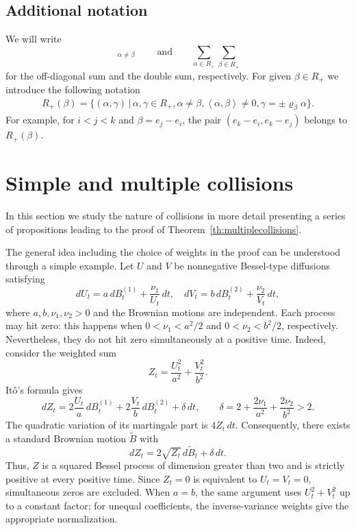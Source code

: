 \documentclass{article}
\numberwithin{equation}{section}
\newcommand{\cond}[1]{\, #1 \vert \,}
\newcommand{\aR}{\alpha\in R_+}
\newcommand{\bR}{\beta\in R_+}
\newcommand{\SabR}{\sum_{\alpha\in R_+}\sum_{\beta\in R_+}}
\newcommand{\SanbR}{\mathop{\sum_{\aR}\sum_{\bR}}_{\alpha\neq \beta}}
\newcommand{\ab}{\left<\alpha,\beta\right>}
\newcommand{\reflect}[1]{\varrho_{#1}}
\theoremstyle{plain}
\begin{document}
\subsection{Additional notation}
We will write  
    \begin{equation*}
        \SanbR\qquad \textrm{and} \qquad \SabR
    \end{equation*}
for the off-diagonal sum and the double sum, respectively. For given $\beta\in R_+$ we introduce the following notation 
\begin{align}
    \label{eq:Rplus}
    R_+(\beta) = \big\{(\alpha,\gamma)\cond{} \alpha,\gamma\in R_+, \alpha\neq \beta, \ab\neq 0,\gamma = \pm\reflect{\beta}\alpha\big\}.
\end{align}
For example, for $i<j<k$ and $\beta=e_j-e_i$,
the pair $(e_k-e_i,e_k-e_j)$ belongs to $R_+(\beta)$.

\section{Simple and multiple collisions}
\label{sec:collisions}
In this section we study the nature of collisions in more detail presenting a series of propositions leading to the proof of Theorem~\ref{th:multiplecollisions}. 

The general idea including the choice of weights in the proof can be understood through a simple example. Let $U$ and $V$ be nonnegative Bessel-type diffusions satisfying
\begin{equation*}
    dU_t=a\,dB_t^{(1)}+\frac{\nu_1}{U_t}\,dt,\quad 
    dV_t=b\,dB_t^{(2)}+\frac{\nu_2}{V_t}\,dt,
\end{equation*}
where $a,b,\nu_1,\nu_2>0$ and the Brownian motions are independent. Each process may hit zero: this happens when $0<\nu_1<a^2/2$ and $0<\nu_2<b^2/2$, respectively. Nevertheless, they do not hit zero simultaneously at a positive time.
Indeed, consider the weighted sum
    \begin{equation*}
        Z_t=\frac{U_t^2}{a^2}+\frac{V_t^2}{b^2}.
    \end{equation*}
It\^o's formula gives
    \begin{equation*}
        dZ_t = 2\frac{U_t}{a}\,dB_t^{(1)} +2\frac{V_t}{b}\,dB_t^{(2)} +\delta\,dt, \qquad \delta=2+\frac{2\nu_1}{a^2}+\frac{2\nu_2}{b^2}>2.
    \end{equation*}
The quadratic variation of its martingale part is $4Z_t\,dt$. Consequently, there exists a standard Brownian motion $\widetilde B$ with
    \begin{equation*}
        dZ_t=2\sqrt{Z_t}\,d\widetilde B_t+\delta\,dt.
    \end{equation*}
Thus, $Z$ is a squared Bessel process of dimension greater than two and is strictly positive at every positive time. Since $Z_t=0$ is equivalent to $U_t=V_t=0$, simultaneous zeros are excluded. When $a=b$, the same argument uses $U_t^2+V_t^2$ up to a constant factor; for unequal coefficients, the inverse-variance weights give the appropriate normalization.
\end{document}
